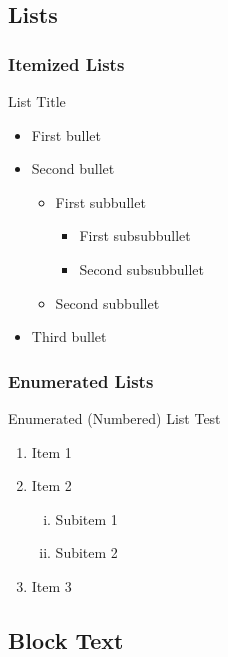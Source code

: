 \subsection{Lists}


\begin{frame}\frametitle{Itemized Lists}

List Title
\begin{itemize}
    \item First bullet
    \item Second bullet
    \begin{itemize}
        \item First subbullet
        \begin{itemize}
            \item First subsubbullet
            \item Second subsubbullet
        \end{itemize}
        \item Second subbullet
    \end{itemize}
    \item Third bullet
\end{itemize}
\end{frame}



\begin{frame} \frametitle{Enumerated Lists}

  Enumerated (Numbered) List Test
  \begin{enumerate}
      \item Item 1
      \item Item 2
      \begin{enumerate}[i)] %
          \item Subitem 1
          \item Subitem 2
      \end{enumerate}
      \item Item 3
  \end{enumerate}
  \end{frame}


\subsection{Block Text}


